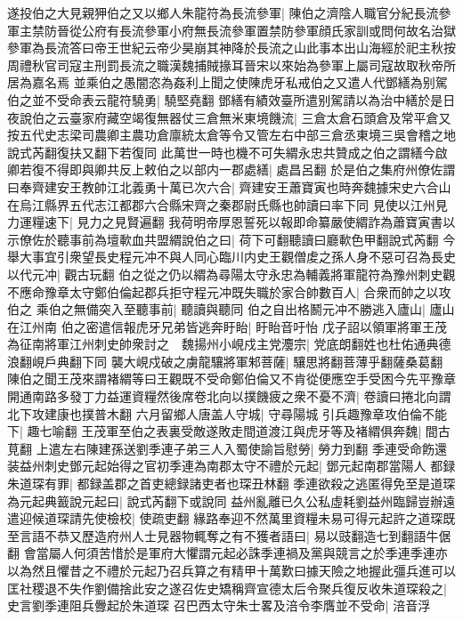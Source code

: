 遂投伯之大見親狎伯之又以鄉人朱龍符為長流參軍|{
	陳伯之濟陰人職官分紀長流參軍主禁防晉從公府有長流參軍小府無長流參軍置禁防參軍顔氏家訓或問何故名治獄參軍為長流答曰帝王世紀云帝少昊崩其神降於長流之山此事本出山海經於祀主秋按周禮秋官司寇主刑罰長流之職漢魏捕賊掾耳晉宋以來始為參軍上屬司寇故取秋帝所居為嘉名焉}
並乘伯之愚闇恣為姦利上聞之使陳虎牙私戒伯之又遣人代鄧繕為别駕伯之並不受命表云龍符驍勇|{
	驍堅堯翻}
鄧繕有績效臺所遣别駕請以為治中繕於是日夜說伯之云臺家府藏空竭復無器仗三倉無米東境饑流|{
	三倉太倉石頭倉及常平倉又按五代史志梁司農卿主農功倉廪統太倉等令又管左右中部三倉丞東境三吳會稽之地說式芮翻復扶又翻下若復同}
此萬世一時也機不可失緭永忠共贊成之伯之謂繕今啟卿若復不得即與卿共反上敕伯之以部内一郡處繕|{
	處昌呂翻}
於是伯之集府州僚佐謂曰奉齊建安王教帥江北義勇十萬已次六合|{
	齊建安王蕭寶寅也時奔魏據宋史六合山在烏江縣界五代志江都郡六合縣宋齊之秦郡尉氏縣也帥讀曰率下同}
見使以江州見力運糧速下|{
	見力之見賢遍翻}
我荷明帝厚恩誓死以報即命纂嚴使緭詐為蕭寶寅書以示僚佐於聽事前為壇㰱血共盟緭說伯之曰|{
	荷下可翻聽讀曰廳㰱色甲翻說式芮翻}
今舉大事宜引衆望長史程元冲不與人同心臨川内史王觀僧䖍之孫人身不惡可召為長史以代元冲|{
	觀古玩翻}
伯之從之仍以緭為尋陽太守永忠為輔義將軍龍符為豫州刺史觀不應命豫章太守鄭伯倫起郡兵拒守程元冲既失職於家合帥數百人|{
	合衆而帥之以攻伯之}
乘伯之無備突入至聽事前|{
	聽讀與聽同}
伯之自出格鬭元冲不勝逃入廬山|{
	廬山在江州南}
伯之密遣信報虎牙兄弟皆逃奔盱眙|{
	盱眙音吁怡}
戊子詔以領軍將軍王茂為征南將軍江州刺史帥衆討之　魏揚州小峴戍主党灋宗|{
	党底朗翻姓也杜佑通典德浪翻峴戶典翻下同}
襲大峴戍破之虜龍驤將軍邾菩薩|{
	驤思將翻菩薄乎翻薩桑葛翻}
陳伯之聞王茂來謂褚緭等曰王觀既不受命鄭伯倫又不肯從便應空手受困今先平豫章開通南路多發丁力益運資糧然後席卷北向以撲饑疲之衆不憂不濟|{
	卷讀曰捲北向謂北下攻建康也撲普木翻}
六月留鄉人唐盖人守城|{
	守尋陽城}
引兵趣豫章攻伯倫不能下|{
	趣七喻翻}
王茂軍至伯之表裏受敵遂敗走間道渡江與虎牙等及褚緭俱奔魏|{
	間古莧翻}
上遣左右陳建孫送劉季連子弟三人入蜀使諭旨慰勞|{
	勞力到翻}
季連受命飭還装益州刺史鄧元起始得之官初季連為南郡太守不禮於元起|{
	鄧元起南郡當陽人}
都録朱道琛有罪|{
	都録盖郡之首吏總録諸吏者也琛丑林翻}
季連欲殺之逃匿得免至是道琛為元起典籖說元起曰|{
	說式芮翻下或說同}
益州亂離已久公私虛耗劉益州臨歸豈辦遠遣迎候道琛請先使檢校|{
	使疏吏翻}
緣路奉迎不然萬里資糧未易可得元起許之道琛既至言語不恭又歷造府州人士見器物輒奪之有不獲者語曰|{
	易以豉翻造七到翻語牛倨翻}
會當屬人何須苦惜於是軍府大懼謂元起必誅季連禍及黨與競言之於季連季連亦以為然且懼昔之不禮於元起乃召兵算之有精甲十萬歎曰據天險之地握此彊兵進可以匡社稷退不失作劉備捨此安之遂召佐史矯稱齊宣德太后令聚兵復反收朱道琛殺之|{
	史言劉季連阻兵釁起於朱道琛}
召巴西太守朱士畧及涪令李膺並不受命|{
	涪音浮}
